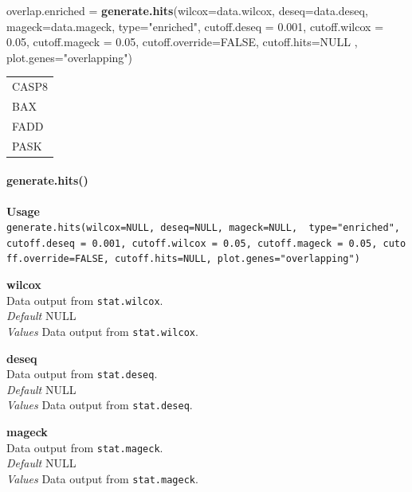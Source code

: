 \documentclass[]{article}
\newenvironment{Shaded}{\begin{snugshade}}{\end{snugshade}}
\newcommand{\KeywordTok}[1]{\textcolor[rgb]{0.13,0.29,0.53}{\textbf{{#1}}}}
\newcommand{\DataTypeTok}[1]{\textcolor[rgb]{0.13,0.29,0.53}{{#1}}}
\newcommand{\FloatTok}[1]{\textcolor[rgb]{0.00,0.00,0.81}{{#1}}}
\newcommand{\StringTok}[1]{\textcolor[rgb]{0.31,0.60,0.02}{{#1}}}
\newcommand{\OtherTok}[1]{\textcolor[rgb]{0.56,0.35,0.01}{{#1}}}
\newcommand{\NormalTok}[1]{{#1}}
\let\oldparagraph\paragraph
\renewcommand{\paragraph}[1]{\oldparagraph{#1}\mbox{}}
\begin{document}
\begin{Shaded}
\begin{Highlighting}[]
\NormalTok{overlap.enriched =}\StringTok{ }\KeywordTok{generate.hits}\NormalTok{(}\DataTypeTok{wilcox=}\NormalTok{data.wilcox, }\DataTypeTok{deseq=}\NormalTok{data.deseq, }\DataTypeTok{mageck=}\NormalTok{data.mageck, }\DataTypeTok{type=}\StringTok{"enriched"}\NormalTok{, }\DataTypeTok{cutoff.deseq =} \FloatTok{0.001}\NormalTok{, }\DataTypeTok{cutoff.wilcox =} \FloatTok{0.05}\NormalTok{, }\DataTypeTok{cutoff.mageck =} \FloatTok{0.05}\NormalTok{, }\DataTypeTok{cutoff.override=}\OtherTok{FALSE}\NormalTok{, }\DataTypeTok{cutoff.hits=}\OtherTok{NULL} \NormalTok{, }\DataTypeTok{plot.genes=}\StringTok{"overlapping"}\NormalTok{)}
\end{Highlighting}
\end{Shaded}

\begin{longtable}[c]{@{}l@{}}
\toprule
CASP8\tabularnewline
BAX\tabularnewline
FADD\tabularnewline
PASK\tabularnewline
\bottomrule
\end{longtable}

\paragraph{generate.hits()}\label{generate.hits}

\textbf{Usage}\\
\texttt{generate.hits(wilcox=NULL,\ deseq=NULL,\ mageck=NULL,\ \ type="enriched",\ cutoff.deseq\ =\ 0.001,\ cutoff.wilcox\ =\ 0.05,\ cutoff.mageck\ =\ 0.05,\ cutoff.override=FALSE,\ cutoff.hits=NULL,\ plot.genes="overlapping")}

\textbf{wilcox}\\
Data output from \texttt{stat.wilcox}.\\
\emph{Default} NULL\\
\emph{Values} Data output from \texttt{stat.wilcox}.

\textbf{deseq}\\
Data output from \texttt{stat.deseq}.\\
\emph{Default} NULL\\
\emph{Values} Data output from \texttt{stat.deseq}.

\textbf{mageck}\\
Data output from \texttt{stat.mageck}.\\
\emph{Default} NULL\\
\emph{Values} Data output from \texttt{stat.mageck}.
\end{document}
